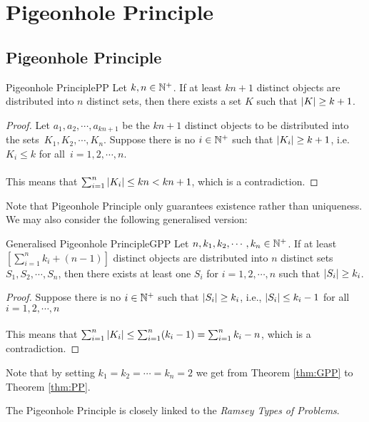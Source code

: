 \documentclass[math]{amznotes}
\theoremstyle{remark}
\begin{document}
\chapter{Pigeonhole Principle}
\section{Pigeonhole Principle}
\begin{thmbox}{Pigeonhole Principle}{PP}
    Let $k, n \in \mathbb{N}^+$. If at least $kn + 1$ distinct objects are distributed into $n$ distinct sets, then there exists a set $K$ such that ${\left\lvert {K} \right\rvert} \geq k + 1$.
    \tcblower   
    \begin{proof}
        Let $a_1, a_2, \cdots, a_{kn + 1}$ be the $kn + 1$ distinct objects to be distributed into the sets~$K_1, K_2, \cdots, K_n$. Suppose there is no $i \in \mathbb{N}^+$ such that ${\left\lvert {K_i} \right\rvert} \geq k + 1$, i.e. $K_i \leq k$ for all~$i = 1, 2, \cdots, n$.
        \\\\
        This means that $\sum_{i = 1}^{n}{\left\lvert {K_i} \right\rvert} \leq kn < kn + 1$, which is a contradiction.
    \end{proof}
\end{thmbox}
Note that Pigeonhole Principle only guarantees existence rather than uniqueness. We may also consider the following generalised version:
\begin{thmbox}{Generalised Pigeonhole Principle}{GPP}
    Let $n, k_1, k_2, \cdots, k_n \in \mathbb{N}^+$. If at least $\left[\sum_{i = 1}^{n}k_i + (n - 1)\right]$ distinct objects are distributed into $n$ distinct sets $S_1, S_2, \cdots, S_n$, then there exists at least one $S_i$ for $i = 1, 2, \cdots, n$ such that ${\left\lvert {S_i} \right\rvert} \geq k_i$.
    \tcblower   
    \begin{proof}
        Suppose there is no $i \in \mathbb{N}^+$ such that ${\left\lvert {S_i} \right\rvert} \geq k_i$, i.e., ${\left\lvert {S_i} \right\rvert} \leq k_i - 1$ for all $i = 1, 2, \cdots, n$
        \\\\
        This means that $\sum_{i = 1}^{n}{\left\lvert {K_i} \right\rvert} \leq \sum_{i = 1}^{n}(k_i - 1) = \sum_{i = 1}^{n}k_i - n$, which is a contradiction.
    \end{proof}
\end{thmbox}
Note that by setting $k_1 = k_2 = \cdots = k_n = 2$ we get from Theorem \ref{thm:GPP} to Theorem \ref{thm:PP}.

The Pigeonhole Principle is closely linked to the \textit{Ramsey Types of Problems}.
\end{document}
